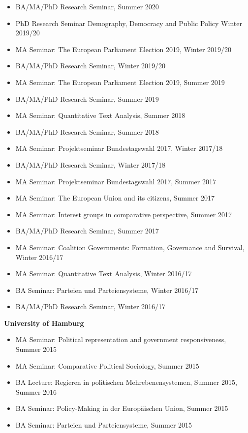 \begin{itemize}[topsep=0pt, noitemsep, leftmargin=3]
	\item BA/MA/PhD Research Seminar, Summer 2020
	\item PhD Research Seminar Demography, Democracy and Public Policy  Winter 2019/20
	\item MA Seminar: The European Parliament Election 2019, Winter 2019/20
	\item BA/MA/PhD Research Seminar, Winter 2019/20
	\item MA Seminar: The European Parliament Election 2019, Summer 2019
	\item BA/MA/PhD Research Seminar, Summer 2019
	\item MA Seminar: Quantitative Text Analysis, Summer 2018
	\item BA/MA/PhD Research Seminar, Summer 2018 
	\item MA Seminar: Projektseminar Bundestagswahl 2017, Winter 2017/18
	\item BA/MA/PhD Research Seminar, Winter 2017/18
	\item MA Seminar: Projektseminar Bundestagswahl 2017, Summer 2017
	\item MA Seminar: The European Union and its citizens, Summer 2017
	\item MA Seminar: Interest groups in comparative perspective, Summer 2017
	\item BA/MA/PhD Research Seminar, Summer 2017
	\item MA Seminar: Coalition Governments: Formation, Governance and Survival, Winter 2016/17
	\item MA Seminar: Quantitative Text Analysis, Winter 2016/17
	\item BA Seminar: Parteien und Parteiensysteme, Winter 2016/17
	\item BA/MA/PhD Research Seminar, Winter 2016/17
\end{itemize}

\vspace{\baselineskip}

\textbf{University of Hamburg}
\begin{itemize}[topsep=0pt, noitemsep, leftmargin=3]
	\item MA Seminar: Political representation and government responsiveness, Summer 2015
	\item MA Seminar: Comparative Political Sociology, Summer 2015
	\item BA Lecture: Regieren in politischen Mehrebenensystemen, Summer 2015, Summer 2016
	\item BA Seminar: Policy-Making in der Europ\"aischen Union, Summer 2015
	\item BA Seminar: Parteien und Parteiensysteme, Summer 2015
\end{itemize}

